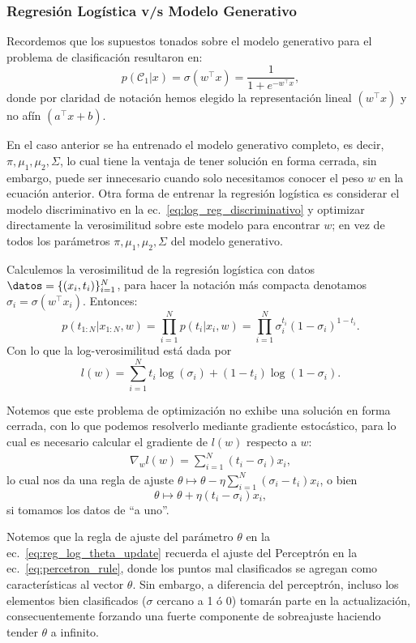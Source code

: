 \subsubsection{Regresión Logística v/s Modelo Generativo}

Recordemos que los supuestos tonados sobre el modelo generativo para el problema de clasificación resultaron en:
\begin{equation}
p(\mathcal{C}_1|x) = \sigma(w^\top x) = \frac{1}{1+e^{-w^\top x}} \label{eq:log_reg_discriminativo},
\end{equation}
donde por claridad de notación hemos elegido la representación lineal $(w^\top x)$ y no afín $(a^\top x + b)$. 

En el caso anterior se ha entrenado el modelo generativo completo, es decir, $\pi, \mu_1,\mu_2, \Sigma$, lo cual tiene la ventaja de tener solución en forma cerrada, sin embargo, puede ser innecesario cuando solo necesitamos conocer el peso $w$ en la ecuación anterior. Otra forma de entrenar la  regresión logística es considerar el modelo discriminativo en la  ec.~\eqref{eq:log_reg_discriminativo} y optimizar directamente la verosimilitud sobre  este modelo para encontrar $w$; en vez de todos los parámetros $\pi,\mu_1,\mu_2,\Sigma$ del modelo generativo.

Calculemos la verosimilitud de la regresión logística con datos $\datos=\{(x_i,t_i)\}_{i=1}^N$, para hacer la notación más compacta denotamos $\sigma_i = \sigma(w^\top x_i)$. Entonces:
\begin{equation}
p(t_{1:N}|x_{1:N},w) = \prod_{i=1}^{N}p(t_i|x_i,w) =  \prod_{i=1}^{N}\sigma_i^{t_i}(1-\sigma_i)^{1-t_i}.
\end{equation}
Con lo que la log-verosimilitud está dada por
\begin{equation}
	l(w) = \sum_{i=1}^N t_i\log(\sigma_i) + (1-t_i)\log(1-\sigma_i).
\end{equation}

Notemos que este  problema de optimización no exhibe una solución en forma cerrada, con lo que podemos resolverlo mediante gradiente estocástico, para lo cual es necesario calcular el gradiente de $l(w)$ respecto a $w$:
\begin{align}
\nabla_w l(w) = \sum_{i=1}^N (t_i-\sigma_i)x_i,
\end{align}
lo cual nos da una regla de  ajuste $\theta \mapsto \theta - \eta \sum_{i=1}^N (\sigma_i-t_i)x_i$, o bien 
\begin{equation}
	\theta \mapsto \theta + \eta(t_i-\sigma_i)x_i, \label{eq:reg_log_theta_update}
\end{equation}
si tomamos los  datos de ``a uno''.
\begin{remark}\label{rem:log_reg_shocks}
Notemos que la regla de ajuste del parámetro $\theta$ en la ec.~\eqref{eq:reg_log_theta_update} recuerda el ajuste del Perceptrón en la ec.~\eqref{eq:percetron_rule}, donde los puntos mal clasificados se agregan como características al vector $\theta$. Sin  embargo, a diferencia del  perceptrón, incluso los elementos bien clasificados ($\sigma$  cercano a  1 ó 0) tomarán parte en la actualización, consecuentemente forzando una  fuerte componente de sobreajuste  haciendo tender $\theta$ a infinito. 
\end{remark}